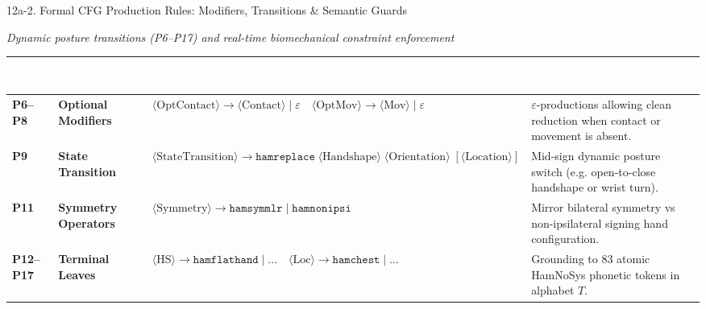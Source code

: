 \documentclass[aspectratio=169,xcolor={table,dvipsnames}]{beamer}
\begin{document}
\begin{frame}[t]{12a-2. Formal CFG Production Rules: Modifiers, Transitions \& Semantic Guards}
\vspace{-0.1cm}
\begin{center}
    \scriptsize\textit{\textcolor{amritaMaroon}{Dynamic posture transitions (P6--P17) and real-time biomechanical constraint enforcement}}
\end{center}

\vspace{-1.5mm}
\centering
\setlength{\tabcolsep}{4pt}
\renewcommand{\arraystretch}{1.22}
{\fontsize{6.8pt}{8.6pt}\selectfont
\begin{tabular}{|>{\centering\arraybackslash\bfseries}p{1.1cm}|>{\raggedright\arraybackslash\bfseries}p{2.5cm}|>{\raggedright\arraybackslash}p{5.8cm}|>{\raggedright\arraybackslash}p{3.2cm}|}
    \hline
    \rowcolor{maroon}
    \textcolor{white}{\textbf{Rule ID}} & 
    \textcolor{white}{\textbf{Constituent}} & 
    \textcolor{white}{\textbf{Production Rule in BNF Form}} & 
    \textcolor{white}{\textbf{Linguistic Meaning}} \\
    \hline
    \rowcolor{lightpink} 
    \textbf{P6--P8} & Optional Modifiers & 
    $\langle\text{OptContact}\rangle \to \langle\text{Contact}\rangle \mid \varepsilon \quad \langle\text{OptMov}\rangle \to \langle\text{Mov}\rangle \mid \varepsilon$ & 
    $\varepsilon$-productions allowing clean reduction when contact or movement is absent. \\
    \hline
    \rowcolor{lightpurple} 
    \textbf{P9} & State Transition & 
    $\langle\text{StateTransition}\rangle \to \texttt{hamreplace} \;\langle\text{Handshape}\rangle \;\langle\text{Orientation}\rangle \;[\langle\text{Location}\rangle]$ & 
    Mid-sign dynamic posture switch (e.g. open-to-close handshape or wrist turn). \\
    \hline
    \rowcolor{lightblue} 
    \textbf{P11} & Symmetry Operators & 
    $\langle\text{Symmetry}\rangle \to \texttt{hamsymmlr} \mid \texttt{hamnonipsi}$ & 
    Mirror bilateral symmetry vs non-ipsilateral signing hand configuration. \\
    \hline
    \rowcolor{white} 
    \textbf{P12--P17} & Terminal Leaves & 
    $\langle\text{HS}\rangle \to \texttt{hamflathand} \mid \dots \quad \langle\text{Loc}\rangle \to \texttt{hamchest} \mid \dots$ & 
    Grounding to 83 atomic HamNoSys phonetic tokens in alphabet $T$. \\
    \hline
\end{tabular}
}


\end{frame}
\end{document}
